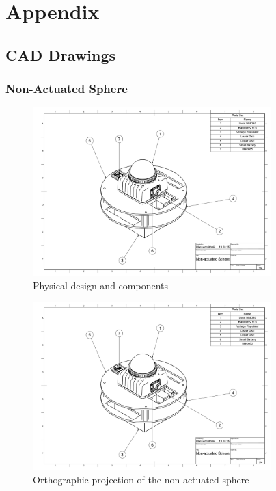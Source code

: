 \documentclass[english, bachelor, utf8]{base/thesis_telematics}
\begin{document}
\chapter{Appendix}

\section{CAD Drawings}
\subsection{Non-Actuated Sphere}
\label{sec:complete-structure}
\clearpage %

\begin{figure}[H]
\centering
\includegraphics[width=0.82\textwidth,page=1]{pics/Non_actuated_Sphere_drawing.pdf}
\caption{Physical design and components}
\label{fig:system_page1}
\end{figure}

\begin{figure}[H]
\centering
\includegraphics[width=0.82\textwidth,page=2]{pics/Non_actuated_Sphere_drawing.pdf}
\caption{Orthographic projection of the non-actuated sphere}
\label{fig:system_page2}
\end{figure}
\end{document}
